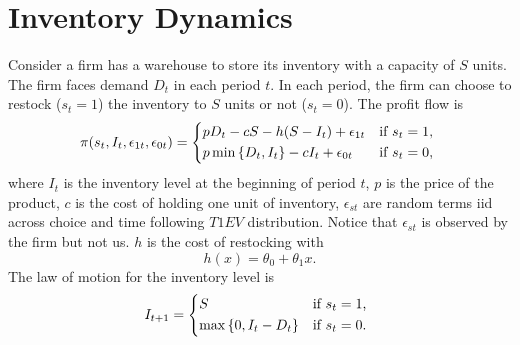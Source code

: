 \documentclass[12pt]{article}
\begin{document}
\section{Inventory Dynamics}
Consider a firm has a warehouse to store its inventory with 
a capacity of $S$ units. The firm faces demand $D_t$ in each 
period $t$. In each period, the firm can choose to 
restock ($s_t = 1$) the inventory to $S$ units or not ($s_t = 0$). 
The profit flow is 
\begin{equation*}
    \pi(s_t, I_t, \epsilon_{1t}, \epsilon_{0t}) = 
    \begin{cases*}
        pD_t - cS - h(S - I_t) + \epsilon_{1t} & if $s_t = 1$, \\
        p\min\brc{D_t, I_t} - cI_t + \epsilon_{0t} & if $s_t = 0$,
    \end{cases*}
\end{equation*}  
where $I_t$ is the inventory level at the beginning of period $t$, 
$p$ is the price of the product, $c$ is the cost of holding one unit 
of inventory, $\epsilon_{st}$ are random terms iid across choice and 
time following $T1EV$ distribution. Notice that $\epsilon_{st}$ is 
observed by the firm but not us. $h$ is the cost of restocking with 
\begin{equation*}
    h(x) = \theta_0 + \theta_1x.
\end{equation*}
The law of motion for the inventory level is 
\begin{equation*}
    I_{t+1} = 
    \begin{cases*}
        S & if $s_t = 1$, \\
        \max\brc{0,I_t - D_t} & if $s_t = 0$.
    \end{cases*}
\end{equation*}
\end{document}
